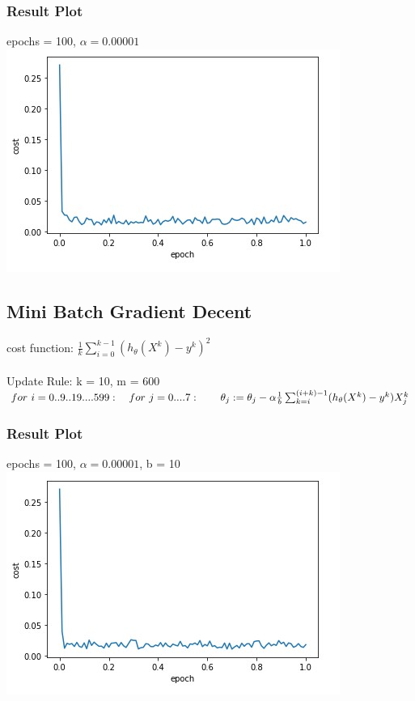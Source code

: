 \documentclass[10pt]{article}
\begin{document}
\newpage
\subsubsection{Result Plot}
epochs = 100, $\alpha = 0.00001$\\

\includegraphics[scale=.6]{mse_stoch}


\subsection{Mini Batch Gradient Decent}
cost function:
    $\frac{1}{k} \sum_{i=0}^{k-1} (h_{\theta}(X^{k}) - y^{k})^{2}$
    \\\\
Update Rule: k = 10, m = 600\\
    $ for~i=0..9..19....599:\\
    ~~~for~j=0....7:\\
    ~~~~~~\theta_{j} := \theta_{j} - \alpha \frac{1}{b} \sum_{k=i}^{(i+k)-1}(h_{\theta}(X^{k}) - y^{k}) X^{k}_{j}$

\subsubsection{Result Plot}
epochs = 100, $\alpha = 0.00001$, b  = 10\\

\includegraphics[scale=.6]{mse_mini}
\end{document}
